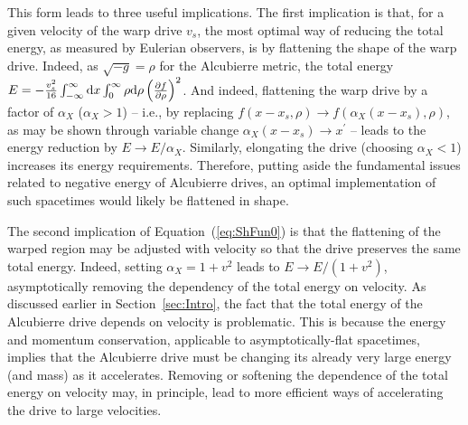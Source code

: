 \documentclass[10pt]{iopart}
\begin{document}
This form leads to three useful implications. The first implication is that, for a given velocity of the warp drive $v_s$, the most optimal way of reducing the total energy, as measured by Eulerian observers, is by flattening the shape of the warp drive. Indeed, as $\sqrt{-g}=\rho$ for the Alcubierre metric, the total energy %
$E=-\frac{v_s^2}{16}\int_{-\infty}^{\infty}{\rm d}x \int_0^{\infty}{\rho{\rm d}\rho}\left(\frac{{\partial} f}{{\partial} \rho}\right)^2$. And indeed, flattening the warp drive by a factor of $\alpha_X$ ($\alpha_X>1$) -- i.e., by replacing $f(x-x_s, \rho) \rightarrow f(\alpha_X(x-x_s), \rho)$, as may be shown through variable change $\alpha_X(x-x_s) \rightarrow x^\prime$ -- leads to the energy reduction by $E\rightarrow E/\alpha_X$. Similarly, elongating the drive (choosing $\alpha_X<1$) increases its energy requirements. Therefore, putting aside the fundamental issues related to negative energy of Alcubierre drives, an optimal implementation of such spacetimes would likely be flattened in shape.

The second implication of Equation~(\ref{eq:ShFun0}) is that the flattening of the warped region may be adjusted with velocity so that the drive preserves the same total energy. Indeed, setting $\alpha_X=1+v^2$ leads to $E\rightarrow E/(1+v^2)$, asymptotically removing the dependency of the total energy on velocity. As discussed earlier in Section~\ref{sec:Intro}, the fact that the total energy of the Alcubierre drive depends on velocity is problematic. This is because the energy and momentum conservation, applicable to asymptotically-flat spacetimes, implies that the Alcubierre drive must be changing its already very large energy (and mass) as it accelerates. Removing or softening the dependence of the total energy on velocity may, in principle, lead to more efficient ways of accelerating the drive to large velocities.
\end{document}
